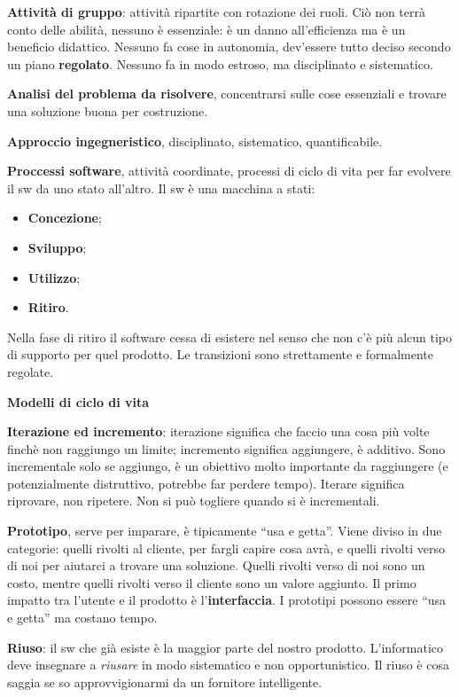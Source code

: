 \textbf{Attività di gruppo}: attività ripartite con rotazione dei ruoli. Ciò non terrà conto delle abilità, nessuno è essenziale: è un danno all'efficienza ma è un beneficio didattico. Nessuno fa cose in autonomia, dev'essere tutto deciso secondo un piano \textbf{regolato}. Nessuno fa in modo estroso, ma disciplinato e sistematico.

\textbf{Analisi del problema da risolvere}, concentrarsi sulle cose essenziali e trovare una soluzione buona per costruzione.

\textbf{Approccio ingegneristico}, disciplinato, sistematico, quantificabile.

\textbf{Proccessi software}, attività coordinate, processi di ciclo di vita per far evolvere il sw da uno stato all'altro. Il sw è una macchina a stati:

\begin{itemize}

	\item \textbf{Concezione};
	\item \textbf{Sviluppo};
	\item \textbf{Utilizzo};
	\item \textbf{Ritiro}.

\end{itemize}

Nella fase di ritiro il software cessa di esistere nel senso che non c'è più alcun tipo di supporto per quel prodotto. Le transizioni sono strettamente e formalmente regolate.

\textbf{Modelli di ciclo di vita}

\textbf{Iterazione ed incremento}: iterazione significa che faccio una cosa più volte finchè non raggiungo un limite; incremento significa aggiungere, è additivo. Sono incrementale solo se aggiungo, è un obiettivo molto importante da raggiungere (e potenzialmente distruttivo, potrebbe far perdere tempo). Iterare significa riprovare, non ripetere. Non si può togliere quando si è incrementali.

\textbf{Prototipo}, serve per imparare, è tipicamente “usa e getta”. Viene diviso in due categorie: quelli rivolti al cliente, per fargli capire cosa avrà, e quelli rivolti verso di noi per aiutarci a trovare una soluzione. Quelli rivolti verso di noi sono un costo, mentre quelli rivolti verso il cliente sono un valore aggiunto. Il primo impatto tra l'utente e il prodotto è l'\textbf{interfaccia}. I prototipi possono essere ``usa e getta'' ma costano tempo.

\textbf{Riuso}: il sw che già esiste è la maggior parte del nostro prodotto. L'informatico deve insegnare a \textit{riusare} in modo sistematico e non opportunistico. Il riuso è cosa saggia se so approvvigionarmi da un fornitore intelligente.

